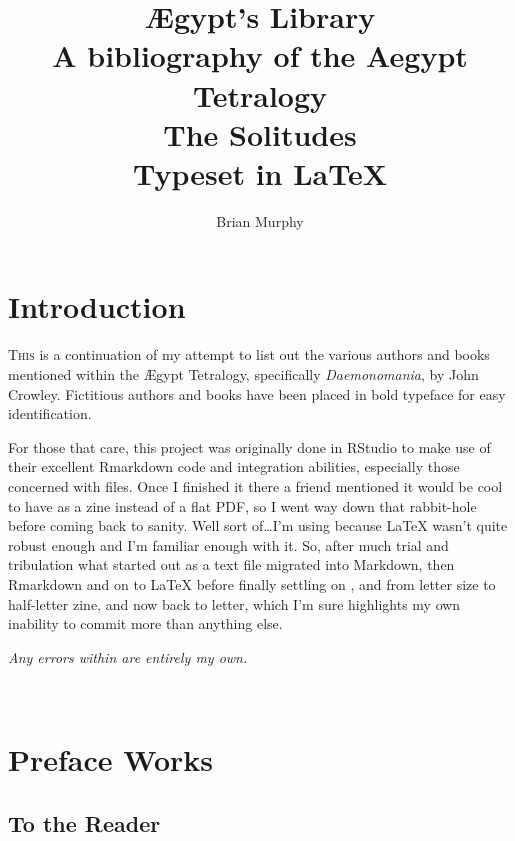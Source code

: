 \documentclass[10pt,makeidx]{extreport}
\author{Brian Murphy}
\title{
 {\Huge Ægypt's Library} \\
 {\footnotesize A bibliography of the Aegypt Tetralogy \\
 \bigskip
 {\Large The Solitudes} \\
 \bigskip
 Typeset in \LaTeX{} \\
 }
}
\date{\begin{small}\today{}\end{small}}
\newcommand\blankpage{%
    \null
    \thispagestyle{empty}%
    \addtocounter{page}{-1}%
    \newpage%
    \pagestyle{fancy}}
\newcommand\nbvspace[1][3]{\vspace*{\stretch{#1}}}
\newcommand{\chapterzodiac}[2]{%
  \chapter[\texorpdfstring{#2}{#2}]{%
    \color{Mahogany}\bfseries
    #2%
    \hfill
    {\shadowtext{{\color{Mahogany}\Huge\Zodiac{#1}}}}%
  }%
}
\begin{document}




\setcounter{tocdepth}{2}
\tableofcontents

\pagestyle{fancy}
\chapterzodiac{12}{Introduction}
\lettrine[lines=4,findent=3pt]{T}{his} is a continuation of my attempt to list out the various authors and books mentioned within the Ægypt Tetralogy, specifically \textit{Daemonomania}, by John Crowley. Fictitious authors and books have been placed in bold typeface for easy identification. 
\par\vspace{0.3\baselineskip}
For those that care, this project was originally done in RStudio to make use of their excellent Rmarkdown code and integration abilities, especially those concerned with  files. Once I finished it there a friend mentioned it would be cool to have as a zine instead of a flat PDF, so I went way down that rabbit-hole before coming back to sanity. Well sort of\dots I'm using  because \LaTeX{} wasn't quite robust enough and I'm familiar enough with it. So, after much trial and tribulation what started out as a text file migrated into Markdown, then Rmarkdown and on to \LaTeX{} before finally settling on , and from letter size to half-letter zine, and now back to letter, which I'm sure highlights my own inability to commit more than anything else.

\vspace*{1cm}

\begin{center}
	\textit{Any errors within are entirely my own.}
\end{center}

\begin{center}
\vfill
\shadowoffset{1pt}
\shadowtext{%
{\color{Mahogany}\fontsize{60}{64}\Mercury}}\\
\nbvspace[1]
\end{center}




\chapterzodiac{12}{Preface Works}
\section{To the Reader}
\end{document}
